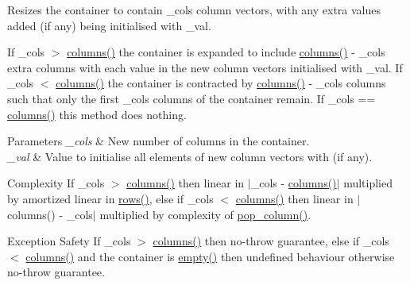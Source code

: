 Resizes the container to contain {\ttfamily \+\_\+cols} column vectors, with any extra values added (if any) being initialised with {\ttfamily \+\_\+val}. 

If {\ttfamily \+\_\+cols $>$ \hyperlink{classcrsc_1_1dynamic__matrix_a43d52d7663b24b2175add500c7650d63}{columns()}} the container is expanded to include {\ttfamily \hyperlink{classcrsc_1_1dynamic__matrix_a43d52d7663b24b2175add500c7650d63}{columns()} -\/ \+\_\+cols} extra columns with each value in the new column vectors initialised with {\ttfamily \+\_\+val}. If {\ttfamily \+\_\+cols $<$ \hyperlink{classcrsc_1_1dynamic__matrix_a43d52d7663b24b2175add500c7650d63}{columns()}} the container is contracted by {\ttfamily \hyperlink{classcrsc_1_1dynamic__matrix_a43d52d7663b24b2175add500c7650d63}{columns()} -\/ \+\_\+cols} columns such that only the first {\ttfamily \+\_\+cols} columns of the container remain. If {\ttfamily \+\_\+cols == \hyperlink{classcrsc_1_1dynamic__matrix_a43d52d7663b24b2175add500c7650d63}{columns()}} this method does nothing.


\begin{DoxyParams}{Parameters}
{\em \+\_\+cols} & New number of columns in the container. \\
\hline
{\em \+\_\+val} & Value to initialise all elements of new column vectors with (if any). \\
\hline
\end{DoxyParams}
\begin{DoxyParagraph}{Complexity}
If {\ttfamily \+\_\+cols $>$ \hyperlink{classcrsc_1_1dynamic__matrix_a43d52d7663b24b2175add500c7650d63}{columns()}} then linear in {\ttfamily $\vert$\+\_\+cols -\/ \hyperlink{classcrsc_1_1dynamic__matrix_a43d52d7663b24b2175add500c7650d63}{columns()}$\vert$} multiplied by amortized linear in {\ttfamily \hyperlink{classcrsc_1_1dynamic__matrix_a5d167a31d3be0ac09d3abdf57a11832d}{rows()}}, else if {\ttfamily \+\_\+cols $<$ \hyperlink{classcrsc_1_1dynamic__matrix_a43d52d7663b24b2175add500c7650d63}{columns()}} then linear in {\ttfamily $\vert$columns() -\/ \+\_\+cols$\vert$} multiplied by complexity of {\ttfamily \hyperlink{classcrsc_1_1dynamic__matrix_ad463395ddeadf2bcae05bd4c0bcfe90c}{pop\+\_\+column()}}. 
\end{DoxyParagraph}
\begin{DoxyParagraph}{Exception Safety}
If {\ttfamily \+\_\+cols $>$ \hyperlink{classcrsc_1_1dynamic__matrix_a43d52d7663b24b2175add500c7650d63}{columns()}} then no-\/throw guarantee, else if {\ttfamily \+\_\+cols $<$ \hyperlink{classcrsc_1_1dynamic__matrix_a43d52d7663b24b2175add500c7650d63}{columns()}} and the container is {\ttfamily \hyperlink{classcrsc_1_1dynamic__matrix_a172206c39c9982863cb435e8d2d1a42e}{empty()}} then undefined behaviour otherwise no-\/throw guarantee. 
\end{DoxyParagraph}
